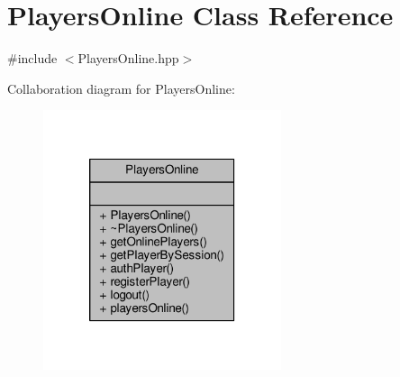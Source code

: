 \hypertarget{class_players_online}{\section{Players\-Online Class Reference}
\label{class_players_online}
}


{\ttfamily \#include $<$Players\-Online.\-hpp$>$}



Collaboration diagram for Players\-Online\-:
\nopagebreak
\begin{figure}[H]
\begin{center}
\leavevmode
\includegraphics[width=198pt]{class_players_online__coll__graph}
\end{center}
\end{figure}
